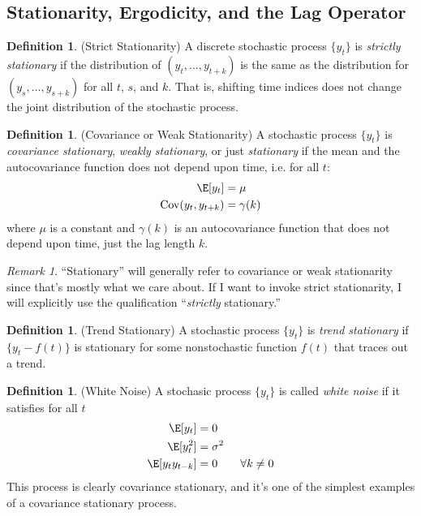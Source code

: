 \documentclass[12pt]{article}
\theoremstyle{plain}
\theoremstyle{definition}
\newtheorem{defn}[thm]{Definition}
\theoremstyle{remark}
\newtheorem*{rmk}{Remark}
\newcommand{\Cov}{\operatorname{Cov}}
\begin{document}
\subsection{Stationarity, Ergodicity, and the Lag Operator}

\begin{defn}(Strict Stationarity)
A discrete stochastic process $\{y_t\}$ is \emph{strictly stationary} if
the distribution of $(y_t,\ldots,y_{t+k})$ is the same as the
distribution for $(y_s,\ldots,y_{s+k})$ for all $t$, $s$, and $k$. That
is, shifting time indices does not change the joint distribution of the
stochastic process.
\end{defn}

\begin{defn}(Covariance or Weak Stationarity)
A stochastic process $\{y_t\}$ is \emph{covariance stationary},
\emph{weakly stationary}, or just \emph{stationary} if the mean and the
autocovariance function does not depend upon time, i.e. for all $t$:
\begin{align*}
  \E[y_t] &= \mu \\
  \Cov(y_t,y_{t+k}) &= \gamma(k)
\end{align*}
where $\mu$ is a constant and $\gamma(k)$ is an autocovariance function
that does not depend upon time, just the lag length $k$.
\end{defn}
\begin{rmk}
``Stationary'' will generally refer to covariance or weak stationarity
since that's mostly what we care about. If I want to invoke strict
stationarity, I will explicitly use the qualification ``\emph{strictly}
stationary.''
\end{rmk}

\begin{defn}(Trend Stationary)
A stochastic process $\{y_t\}$ is \emph{trend stationary} if
$\{y_t-f(t)\}$ is stationary for some nonstochastic function $f(t)$ that
traces out a trend.
\end{defn}


\begin{defn}(White Noise)
A stochasic process $\{y_t\}$ is called \emph{white noise} if it
satisfies for all $t$
\begin{align*}
  \E[y_t] &= 0
  \\
  \E[y_t^2] &= \sigma^2
  \\
  \E[y_ty_{t-k}] &= 0 \qquad \forall k\neq 0
\end{align*}
This process is clearly covariance stationary, and it's one of the
simplest examples of a covariance stationary process.
\end{defn}
\end{document}
